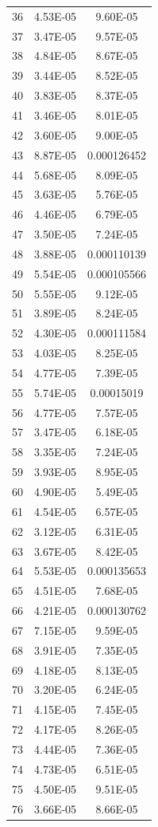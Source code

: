 \documentclass{jreport}		%
\begin{document}
\begin{table}
\begin{tabular}{c|cc}
36&4.53E-05&9.60E-05 \\
37&3.47E-05&9.57E-05 \\
38&4.84E-05&8.67E-05 \\
39&3.44E-05&8.52E-05 \\
40&3.83E-05&8.37E-05 \\
41&3.46E-05&8.01E-05 \\
42&3.60E-05&9.00E-05 \\
43&8.87E-05&0.000126452 \\
44&5.68E-05&8.09E-05 \\
45&3.63E-05&5.76E-05 \\
46&4.46E-05&6.79E-05 \\
47&3.50E-05&7.24E-05 \\
48&3.88E-05&0.000110139 \\
49&5.54E-05&0.000105566 \\
50&5.55E-05&9.12E-05 \\
51&3.89E-05&8.24E-05 \\
52&4.30E-05&0.000111584 \\
53&4.03E-05&8.25E-05 \\
54&4.77E-05&7.39E-05 \\
55&5.74E-05&0.00015019 \\
56&4.77E-05&7.57E-05 \\
57&3.47E-05&6.18E-05 \\
58&3.35E-05&7.24E-05 \\
59&3.93E-05&8.95E-05 \\
60&4.90E-05&5.49E-05 \\
61&4.54E-05&6.57E-05 \\
62&3.12E-05&6.31E-05 \\
63&3.67E-05&8.42E-05 \\
64&5.53E-05&0.000135653 \\
65&4.51E-05&7.68E-05 \\
66&4.21E-05&0.000130762 \\
67&7.15E-05&9.59E-05 \\
68&3.91E-05&7.35E-05 \\
69&4.18E-05&8.13E-05 \\
70&3.20E-05&6.24E-05 \\
71&4.15E-05&7.45E-05 \\
72&4.17E-05&8.26E-05 \\
73&4.44E-05&7.36E-05 \\
74&4.73E-05&6.51E-05 \\
75&4.50E-05&9.51E-05 \\
76&3.66E-05&8.66E-05 \\

\end{tabular}
\end{table}
\end{document}
